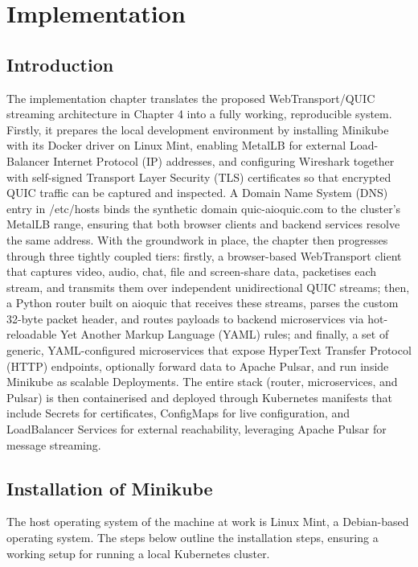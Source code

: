\chapter{Implementation}

\section{Introduction}
The implementation chapter translates the proposed WebTransport/QUIC streaming architecture in Chapter 4 into a fully working, reproducible system. Firstly, it prepares the local development environment by installing Minikube \cite{minikube-docs} with its Docker driver on Linux Mint, enabling MetalLB \cite{metallb-docs} for external Load-Balancer Internet Protocol (IP) addresses, and configuring Wireshark \cite{wireshark-docs} together with self-signed Transport Layer Security (TLS) certificates so that encrypted QUIC traffic can be captured and inspected. A Domain Name System (DNS) entry in /etc/hosts binds the synthetic domain quic-aioquic.com to the cluster’s MetalLB range, ensuring that both browser clients and backend services resolve the same address. With the groundwork in place, the chapter then progresses through three tightly coupled tiers: firstly, a browser-based WebTransport client that captures video, audio, chat, file and screen-share data, packetises each stream, and transmits them over independent unidirectional QUIC streams; then, a Python router built on aioquic \cite{aioquic-repo} that receives these streams, parses the custom 32-byte packet header, and routes payloads to backend microservices via hot-reloadable Yet Another Markup Language (YAML) rules; and finally, a set of generic, YAML-configured microservices that expose HyperText Transfer Protocol (HTTP) endpoints, optionally forward data to Apache Pulsar, and run inside Minikube as scalable Deployments. The entire stack (router, microservices, and Pulsar) is then containerised and deployed through Kubernetes manifests that include Secrets for certificates, ConfigMaps for live configuration, and LoadBalancer Services for external reachability, leveraging Apache Pulsar \cite{pulsar-helm-repo} for message streaming.



\section{Installation of Minikube}
The host operating system of the machine at work is Linux Mint, a Debian-based operating system. The steps below outline the installation steps, ensuring a working setup for running a local Kubernetes cluster.


